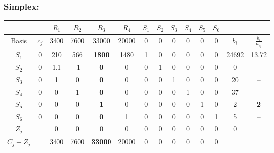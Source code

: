 \documentclass[]{article}
\begin{document}
\subsubsection{Simplex:}

\begin{table}[!htb]
    \centering
    \begin{tabular}{c|c|c|c|c|c|c|c|c|c|c|c|c|c} %
         & & $R_1$ & $R_2$ & $R_3$ & $R_4$ & $S_1$ & $S_2$ & $S_3$ & $S_4$ & $S_5$ & $S_6$ & & \\ \hline
        Basis & $c_j$ & 3400 & 7600 & 33000 & 20000 & 0 & 0 & 0 & 0 & 0 & 0 & $b_i$ & $\frac{b_i}{a_{ij}}$\\ \hline
        $S_1$ & 0 & 210 & 566 & \textbf{1800} & 1480 & 1 & 0 & 0 & 0 & 0 & 0 & 24692 & 13.72\\ \hline
        $S_2$ & 0 & 1.1 & -1 & \textbf{0} & 0 & 0 & 1 & 0 & 0 & 0 & 0 & 0 & --\\ \hline
        $S_3$ & 0 & 1 & 0 & \textbf{0} & 0 & 0 & 0 & 1 & 0 & 0 & 0 & 20 & --\\ \hline
        $S_4$ & 0 & 0 & 1 & \textbf{0} & 0 & 0 & 0 & 0 & 1 & 0 & 0 & 37 & --\\ \hline
        $S_5$ & 0 & 0 & 0 & \textbf{1} & 0 & 0 & 0 & 0 & 0 & 1 & 0 & 2 & \textbf{2} \\ \hline
        $S_6$ & 0 & 0 & 0 & \textbf{0} & 1 & 0 & 0 & 0 & 0 & 0 & 1 & 5 & --\\ \hline
        $Z_j$ & & 0 & 0 & 0 & 0 & 0 & 0 & 0 & 0 & 0 & 0 & 0 & \\
        $C_j-Z_j$ & & 3400 & 7600 & \textbf{33000} & 20000 & 0 & 0 & 0 & 0 & 0 & 0 & & \\ 
    \end{tabular}
\end{table}
\end{document}
